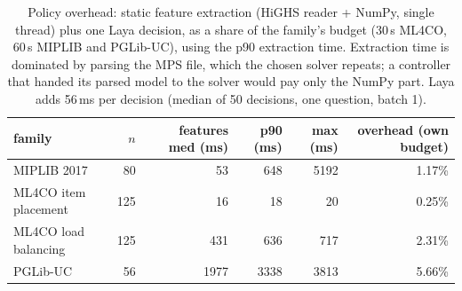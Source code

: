 \begin{table}[t]\centering\small
\begin{tabular}{lrrrrr}
\toprule
family & $n$ & features med (ms) & p90 (ms) & max (ms) & overhead (own budget) \\
\midrule
MIPLIB 2017 & 80 & 53 & 648 & 5192 & 1.17\% \\
ML4CO item placement & 125 & 16 & 18 & 20 & 0.25\% \\
ML4CO load balancing & 125 & 431 & 636 & 717 & 2.31\% \\
PGLib-UC & 56 & 1977 & 3338 & 3813 & 5.66\% \\
\bottomrule
\end{tabular}
\caption{Policy overhead: static feature extraction (HiGHS reader + NumPy, single thread) plus one Laya decision, as a share of the family's budget (30\,s ML4CO, 60\,s MIPLIB and PGLib-UC), using the p90 extraction time. Extraction time is dominated by parsing the MPS file, which the chosen solver repeats; a controller that handed its parsed model to the solver would pay only the NumPy part. Laya adds 56\,ms per decision (median of 50 decisions, one question, batch 1).}\label{tab:overhead}
\end{table}